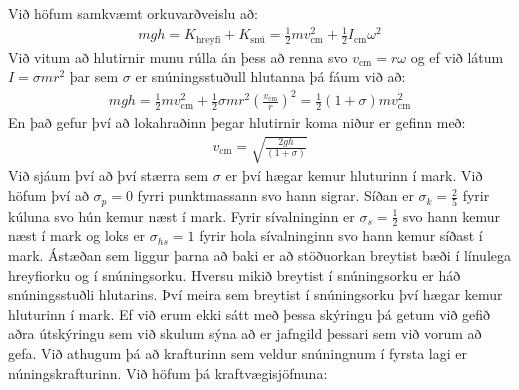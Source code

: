 \ifdefined \wholebook \else\documentclass[oneside]{book}\usepackage{EdlBook}\graphicspath{{figures/}}
\begin{document}
Við höfum samkvæmt orkuvarðveislu að:
\begin{align*}
    mgh = K_{\text{hreyfi}} + K_{\text{snú}} = \frac{1}{2}mv_{\text{cm}}^2 + \frac{1}{2} I_{\text{cm}}\omega^2
\end{align*}
Við vitum að hlutirnir munu rúlla án þess að renna svo $v_{\text{cm}} = r\omega$ og ef við látum $I = \sigma mr^2$ þar sem $\sigma$ er snúningsstuðull hlutanna þá fáum við að:
\begin{align*}
    mgh = \frac{1}{2}mv_{\text{cm}}^2 + \frac{1}{2}\sigma mr^2 \left(\frac{v_{\text{cm}}}{r}\right)^2 = \frac{1}{2}\left(1+\sigma \right)mv_{\text{cm}}^2 
\end{align*}
En það gefur því að lokahraðinn þegar hlutirnir koma niður er gefinn með:
\begin{align*}
    v_{\text{cm}} = \sqrt{\frac{2gh}{(1+\sigma)}}
\end{align*}
Við sjáum því að því stærra sem $\sigma$ er því hægar kemur hluturinn í mark. Við höfum því að $\sigma_p = 0$ fyrri punktmassann svo hann sigrar. Síðan er $\sigma_k = \frac{2}{5}$ fyrir kúluna svo hún kemur næst í mark. Fyrir sívalninginn er $\sigma_s = \frac{1}{2}$ svo hann kemur næst í mark og loks er $\sigma_{hs} = 1$ fyrir hola sívalninginn svo hann kemur síðast í mark. Ástæðan sem liggur þarna að baki er að stöðuorkan breytist bæði í línulega hreyfiorku og í snúningsorku. Hversu mikið breytist í snúningsorku er háð snúningsstuðli hlutarins. Því meira sem breytist í snúningsorku því hægar kemur hluturinn í mark. Ef við erum ekki sátt með þessa skýringu þá getum við gefið aðra útskýringu sem við skulum sýna að er jafngild þessari sem við vorum að gefa. Við athugum þá að krafturinn sem veldur snúningnum í fyrsta lagi er núningskrafturinn. Við höfum þá kraftvægisjöfnuna:
\end{document}
